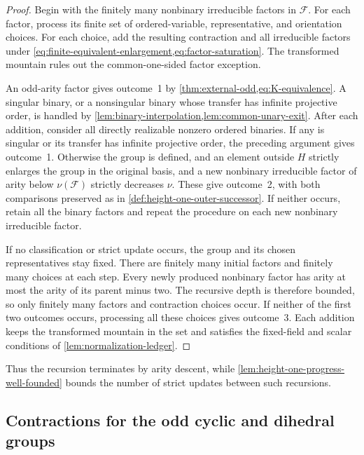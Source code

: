 \documentclass[11pt,letterpaper,onecolumn]{article}
\theoremstyle{plain}
\theoremstyle{definition}
\theoremstyle{remark}
\newcommand{\cF}{\mathcal F}
\begin{document}
	\begin{proof}
		Begin with the finitely many nonbinary irreducible factors in
		\(\cF\).  For each factor, process its finite set of
		ordered-variable, representative, and orientation choices.  For each choice,
		add the resulting contraction and all irreducible factors
		under \cref{eq:finite-equivalent-enlargement,eq:factor-saturation}.
		The transformed mountain rules out the common-one-sided factor exception.
		
		An odd-arity factor gives outcome~1 by \cref{thm:external-odd,eq:K-equivalence}.
		A singular binary, or a nonsingular binary whose transfer has infinite
		projective order, is handled by \cref{lem:binary-interpolation,lem:common-unary-exit}.  After each addition, consider all directly realizable
		nonzero ordered binaries.  If any is singular or its transfer has infinite
		projective order, the preceding argument gives outcome~1.
		Otherwise the group is defined, and an element outside \(H\) strictly
		enlarges the group in the original basis,
		and a new nonbinary irreducible factor of arity below \(\nu(\cF)\)
		strictly decreases \(\nu\).  These give outcome~2, with both comparisons
		preserved as in \cref{def:height-one-outer-successor}.
		If neither occurs, retain all the binary factors and repeat the procedure
		on each new nonbinary irreducible factor.
		
		If no classification or strict update occurs, the group and its chosen
		representatives stay fixed. There are finitely many initial factors and
		finitely many choices at each step. Every newly produced nonbinary factor
		has arity at most the arity of
		its parent minus two.  The recursive depth is therefore bounded, so only
		finitely many factors and contraction choices occur.  If neither of the
		first two outcomes occurs, processing all these choices gives outcome~3.
		Each addition keeps the transformed mountain in the set and satisfies the fixed-field and scalar conditions of \cref{lem:normalization-ledger}. \end{proof}

Thus the recursion terminates by arity descent, while
\cref{lem:height-one-progress-well-founded} bounds the number of strict
updates between such recursions.
	
	\subsection{Contractions for the odd cyclic and dihedral groups}
	\label{subsec:residual-phase-toolkit}
\end{document}
